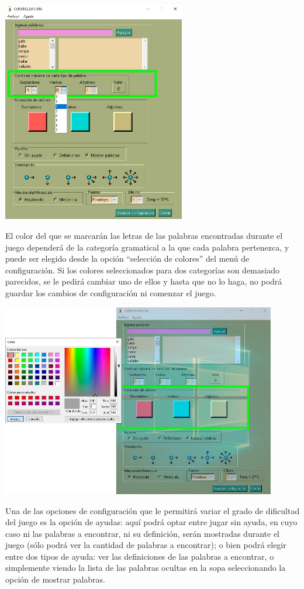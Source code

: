 \includegraphics[width=0.6\textwidth,keepaspectratio]{img/guia/6.jpg}

El color del que se marcarán las letras de las palabras encontradas durante el juego dependerá de la categoría gramatical a la que cada palabra pertenezca, y puede ser elegido desde la opción “selección de colores” del menú de configuración. Si los colores seleccionados para dos categorías son demasiado parecidos, se le pedirá cambiar uno de ellos y hasta que no lo haga, no podrá guardar los cambios de configuración ni comenzar el juego.

\includegraphics[width=0.9\textwidth,keepaspectratio]{img/guia/7.jpg}

Una de las opciones de configuración que le permitirá variar el grado de dificultad del juego es la opción de ayudas: aquí podrá optar entre jugar sin ayuda, en cuyo caso ni las palabras a encontrar, ni su definición, serán mostradas durante el juego (sólo podrá ver la cantidad de palabras a encontrar); o bien podrá elegir entre dos tipos de ayuda: ver las definiciones de las palabras a encontrar, o simplemente viendo la lista de las palabras ocultas en la sopa seleccionando la opción de mostrar palabras.

